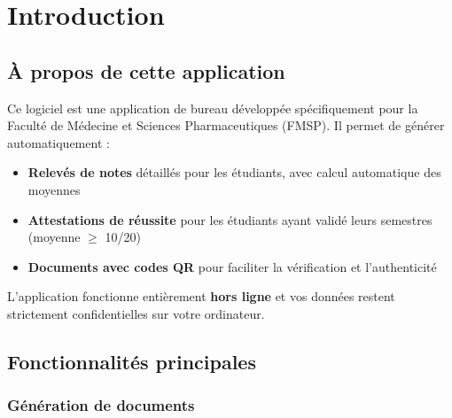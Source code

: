 \section{Introduction}

\subsection{À propos de cette application}

Ce logiciel est une application de bureau développée spécifiquement pour la Faculté de Médecine et Sciences Pharmaceutiques (FMSP). Il permet de générer automatiquement :

\begin{itemize}[leftmargin=*]
    \item \textbf{Relevés de notes} détaillés pour les étudiants, avec calcul automatique des moyennes
    \item \textbf{Attestations de réussite} pour les étudiants ayant validé leurs semestres (moyenne $\geq$ 10/20)
    \item \textbf{Documents avec codes QR} pour faciliter la vérification et l'authenticité
\end{itemize}

L'application fonctionne entièrement \textbf{hors ligne} et vos données restent strictement confidentielles sur votre ordinateur.

\subsection{Fonctionnalités principales}

\subsubsection{Génération de documents}

